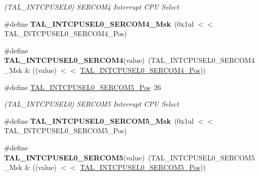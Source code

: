 \begin{DoxyCompactItemize}
\begin{DoxyCompactList}\small\item\em (T\+A\+L\+\_\+\+I\+N\+T\+C\+P\+U\+S\+E\+L0) S\+E\+R\+C\+O\+M4 Interrupt C\+P\+U Select \end{DoxyCompactList}\item 
\hypertarget{group___s_a_m_l21___t_a_l_gaa8e7c658d15b01a29082d7baee597f2b}{}\#define {\bfseries T\+A\+L\+\_\+\+I\+N\+T\+C\+P\+U\+S\+E\+L0\+\_\+\+S\+E\+R\+C\+O\+M4\+\_\+\+Msk}~(0x1ul $<$$<$ T\+A\+L\+\_\+\+I\+N\+T\+C\+P\+U\+S\+E\+L0\+\_\+\+S\+E\+R\+C\+O\+M4\+\_\+\+Pos)\label{group___s_a_m_l21___t_a_l_gaa8e7c658d15b01a29082d7baee597f2b}

\item 
\hypertarget{group___s_a_m_l21___t_a_l_ga2b5570bc3374bce4d561c17cfa5675b0}{}\#define {\bfseries T\+A\+L\+\_\+\+I\+N\+T\+C\+P\+U\+S\+E\+L0\+\_\+\+S\+E\+R\+C\+O\+M4}(value)~(T\+A\+L\+\_\+\+I\+N\+T\+C\+P\+U\+S\+E\+L0\+\_\+\+S\+E\+R\+C\+O\+M4\+\_\+\+Msk \& ((value) $<$$<$ \hyperlink{group___s_a_m_l21___t_a_l_ga26bb9bb5ff3cfe744a45b16544247f97}{T\+A\+L\+\_\+\+I\+N\+T\+C\+P\+U\+S\+E\+L0\+\_\+\+S\+E\+R\+C\+O\+M4\+\_\+\+Pos}))\label{group___s_a_m_l21___t_a_l_ga2b5570bc3374bce4d561c17cfa5675b0}

\item 
\hypertarget{group___s_a_m_l21___t_a_l_ga4cd46ac5de0b2daf0b9d0104593435ed}{}\#define \hyperlink{group___s_a_m_l21___t_a_l_ga4cd46ac5de0b2daf0b9d0104593435ed}{T\+A\+L\+\_\+\+I\+N\+T\+C\+P\+U\+S\+E\+L0\+\_\+\+S\+E\+R\+C\+O\+M5\+\_\+\+Pos}~26\label{group___s_a_m_l21___t_a_l_ga4cd46ac5de0b2daf0b9d0104593435ed}

\begin{DoxyCompactList}\small\item\em (T\+A\+L\+\_\+\+I\+N\+T\+C\+P\+U\+S\+E\+L0) S\+E\+R\+C\+O\+M5 Interrupt C\+P\+U Select \end{DoxyCompactList}\item 
\hypertarget{group___s_a_m_l21___t_a_l_gad0be62e76a6b5b5eb567472a9de793ae}{}\#define {\bfseries T\+A\+L\+\_\+\+I\+N\+T\+C\+P\+U\+S\+E\+L0\+\_\+\+S\+E\+R\+C\+O\+M5\+\_\+\+Msk}~(0x1ul $<$$<$ T\+A\+L\+\_\+\+I\+N\+T\+C\+P\+U\+S\+E\+L0\+\_\+\+S\+E\+R\+C\+O\+M5\+\_\+\+Pos)\label{group___s_a_m_l21___t_a_l_gad0be62e76a6b5b5eb567472a9de793ae}

\item 
\hypertarget{group___s_a_m_l21___t_a_l_ga42417b7093fc6d66ca377d4e40832590}{}\#define {\bfseries T\+A\+L\+\_\+\+I\+N\+T\+C\+P\+U\+S\+E\+L0\+\_\+\+S\+E\+R\+C\+O\+M5}(value)~(T\+A\+L\+\_\+\+I\+N\+T\+C\+P\+U\+S\+E\+L0\+\_\+\+S\+E\+R\+C\+O\+M5\+\_\+\+Msk \& ((value) $<$$<$ \hyperlink{group___s_a_m_l21___t_a_l_ga4cd46ac5de0b2daf0b9d0104593435ed}{T\+A\+L\+\_\+\+I\+N\+T\+C\+P\+U\+S\+E\+L0\+\_\+\+S\+E\+R\+C\+O\+M5\+\_\+\+Pos}))\label{group___s_a_m_l21___t_a_l_ga42417b7093fc6d66ca377d4e40832590}


\end{DoxyCompactItemize}
